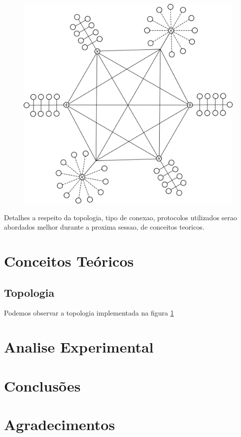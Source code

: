 \documentclass[conference]{IEEEtran}
\begin{document}
	\begin{figure}[h]
		\centering
		\includegraphics[scale=0.45]{./images/topologia}
		\caption{}
		\label{fig:topologia}
	\end{figure}

	Detalhes a respeito da  topologia, tipo de conexao, protocolos utilizados serao abordados melhor durante a proxima sessao, de conceitos teoricos. 

\section{Conceitos Teóricos}

	\subsection{\textbf{Topologia}}
		Podemos observar a topologia implementada na figura \ref{fig:topologia} 

\section{Analise Experimental}

\section{Conclusões}



\section*{Agradecimentos}


\end{document}
